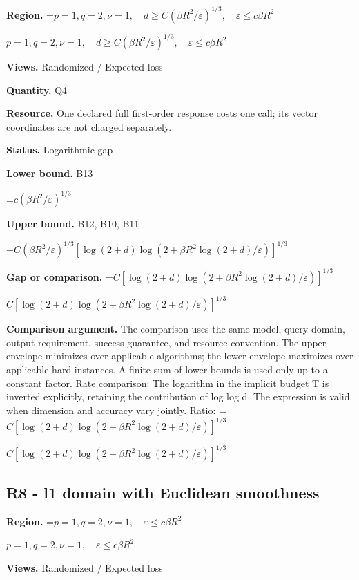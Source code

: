\documentclass[10pt,a4paper]{article}
\newcommand{\AtlasMath}[1]{\par\begingroup\centering\setbox0=\hbox{$\displaystyle #1$}\ifdim\wd0>1.4\linewidth\typeout{ATLAS WIDE FORMULA: \the\wd0}\fi\ifdim\wd0>\linewidth\resizebox{\linewidth}{!}{\box0}\else\box0\fi\par\endgroup}
\newcommand{\AtlasInlineMath}[1]{\begingroup\setbox0=\hbox{$#1$}\ifdim\wd0>.4\linewidth\endgroup\AtlasMath{#1}\else\endgroup$#1$\fi}
\begin{document}
\textbf{Region.} \AtlasInlineMath{p=1,q=2,\nu=1,\quad d\ge C(\beta R^2/\varepsilon)^{1/3},\quad\varepsilon\le c\beta R^2}



\textbf{Views.} Randomized / Expected loss



\textbf{Quantity.} Q4



\textbf{Resource.} One declared full first-order response costs one call; its vector coordinates are not charged separately.



\textbf{Status.} Logarithmic gap



\textbf{Lower bound.} B13



\AtlasMath{c(\beta R^2/\varepsilon)^{1/3}}


\textbf{Upper bound.} B12, B10, B11



\AtlasMath{C(\beta R^2/\varepsilon)^{1/3}[\log(2+d)\log(2+\beta R^2\log(2+d)/\varepsilon)]^{1/3}}


\textbf{Gap or comparison.} \AtlasInlineMath{C[\log(2+d)\log(2+\beta R^2\log(2+d)/\varepsilon)]^{1/3}}



\textbf{Comparison argument.} The comparison uses the same model, query domain, output requirement, success guarantee, and resource convention. The upper envelope minimizes over applicable algorithms; the lower envelope maximizes over applicable hard instances. A finite sum of lower bounds is used only up to a constant factor. Rate comparison: The logarithm in the implicit budget T is inverted explicitly, retaining the contribution of log log d. The expression is valid when dimension and accuracy vary jointly. Ratio: \AtlasInlineMath{C[\log(2+d)\log(2+\beta R^2\log(2+d)/\varepsilon)]^{1/3}}



\subsection{R8 - l1 domain with Euclidean smoothness}


\textbf{Region.} \AtlasInlineMath{p=1,q=2,\nu=1,\quad\varepsilon\le c\beta R^2}



\textbf{Views.} Randomized / Expected loss
\end{document}
